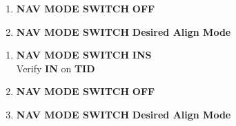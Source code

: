 \documentclass[fontInter]{TechCheck}
\begin{document}
\begin{longtableitemize}
{\begin{tableminipage}
			\begin{enumerate}
				\item \textbf{NAV MODE SWITCH} \dotfill \textbf{OFF}
				\item \textbf{NAV MODE SWITCH} \dotfill \textbf{Desired Align Mode}
			\end{enumerate}
			\begin{enumerate}
				\item \textbf{NAV MODE SWITCH} \dotfill \textbf{INS} \\
				\hfill Verify \textbf{IN} on \textbf{TID}
				\item \textbf{NAV MODE SWITCH} \dotfill \textbf{OFF}
				\item \textbf{NAV MODE SWITCH} \dotfill \textbf{Desired Align Mode}
			\end{enumerate}
		\end{tableminipage}}
	\end{longtableitemize}

\end{document}
